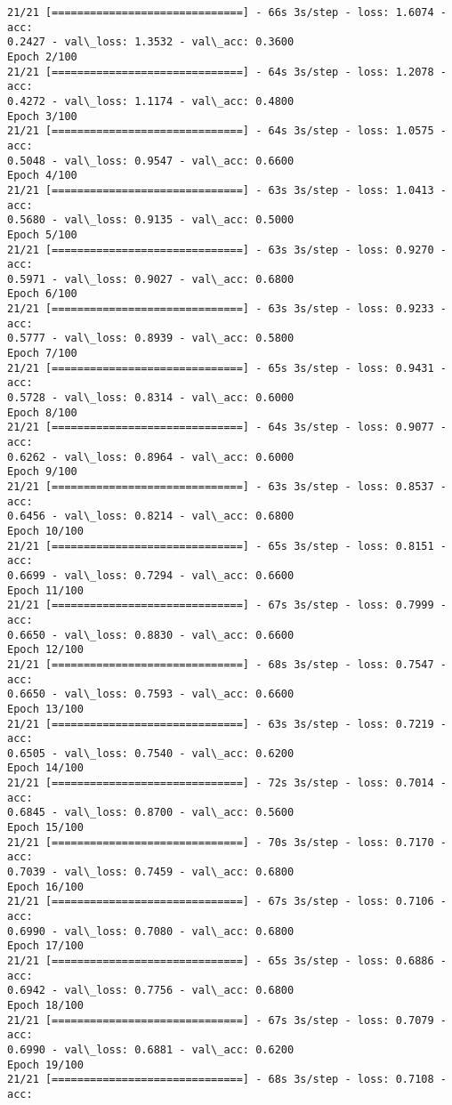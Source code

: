 \documentclass[11pt]{article}
\begin{document}
    \begin{Verbatim}[commandchars=\\\{\}]
21/21 [==============================] - 66s 3s/step - loss: 1.6074 - acc:
0.2427 - val\_loss: 1.3532 - val\_acc: 0.3600
Epoch 2/100
21/21 [==============================] - 64s 3s/step - loss: 1.2078 - acc:
0.4272 - val\_loss: 1.1174 - val\_acc: 0.4800
Epoch 3/100
21/21 [==============================] - 64s 3s/step - loss: 1.0575 - acc:
0.5048 - val\_loss: 0.9547 - val\_acc: 0.6600
Epoch 4/100
21/21 [==============================] - 63s 3s/step - loss: 1.0413 - acc:
0.5680 - val\_loss: 0.9135 - val\_acc: 0.5000
Epoch 5/100
21/21 [==============================] - 63s 3s/step - loss: 0.9270 - acc:
0.5971 - val\_loss: 0.9027 - val\_acc: 0.6800
Epoch 6/100
21/21 [==============================] - 63s 3s/step - loss: 0.9233 - acc:
0.5777 - val\_loss: 0.8939 - val\_acc: 0.5800
Epoch 7/100
21/21 [==============================] - 65s 3s/step - loss: 0.9431 - acc:
0.5728 - val\_loss: 0.8314 - val\_acc: 0.6000
Epoch 8/100
21/21 [==============================] - 64s 3s/step - loss: 0.9077 - acc:
0.6262 - val\_loss: 0.8964 - val\_acc: 0.6000
Epoch 9/100
21/21 [==============================] - 63s 3s/step - loss: 0.8537 - acc:
0.6456 - val\_loss: 0.8214 - val\_acc: 0.6800
Epoch 10/100
21/21 [==============================] - 65s 3s/step - loss: 0.8151 - acc:
0.6699 - val\_loss: 0.7294 - val\_acc: 0.6600
Epoch 11/100
21/21 [==============================] - 67s 3s/step - loss: 0.7999 - acc:
0.6650 - val\_loss: 0.8830 - val\_acc: 0.6600
Epoch 12/100
21/21 [==============================] - 68s 3s/step - loss: 0.7547 - acc:
0.6650 - val\_loss: 0.7593 - val\_acc: 0.6600
Epoch 13/100
21/21 [==============================] - 63s 3s/step - loss: 0.7219 - acc:
0.6505 - val\_loss: 0.7540 - val\_acc: 0.6200
Epoch 14/100
21/21 [==============================] - 72s 3s/step - loss: 0.7014 - acc:
0.6845 - val\_loss: 0.8700 - val\_acc: 0.5600
Epoch 15/100
21/21 [==============================] - 70s 3s/step - loss: 0.7170 - acc:
0.7039 - val\_loss: 0.7459 - val\_acc: 0.6800
Epoch 16/100
21/21 [==============================] - 67s 3s/step - loss: 0.7106 - acc:
0.6990 - val\_loss: 0.7080 - val\_acc: 0.6800
Epoch 17/100
21/21 [==============================] - 65s 3s/step - loss: 0.6886 - acc:
0.6942 - val\_loss: 0.7756 - val\_acc: 0.6800
Epoch 18/100
21/21 [==============================] - 67s 3s/step - loss: 0.7079 - acc:
0.6990 - val\_loss: 0.6881 - val\_acc: 0.6200
Epoch 19/100
21/21 [==============================] - 68s 3s/step - loss: 0.7108 - acc:

\end{Verbatim}
\end{document}

